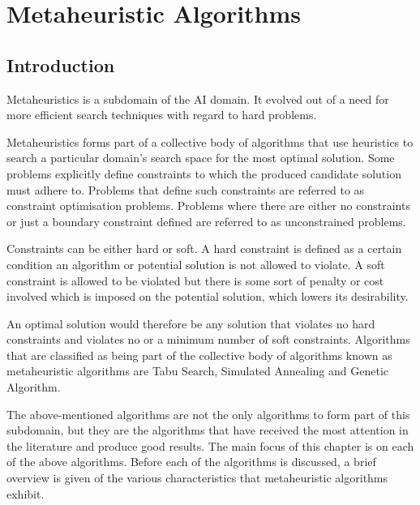 \chapter{Metaheuristic Algorithms}
\label{chpt:heuristic}
\section{Introduction}
Metaheuristics is a subdomain of the \gls{AI} domain\cite{AIModernApproach}. It evolved out of a need for more efficient search techniques with regard to hard problems. 

Metaheuristics forms part of a collective body of algorithms that use heuristics to search a particular domain's search space for the most optimal solution\cite{AIModernApproach,NatureInspiredMetaHeuristic}. Some problems explicitly define constraints to which the produced candidate solution must adhere to. Problems that define such constraints are referred to as constraint optimisation problems\cite{FundamentalSwarm}. Problems where there are either no constraints or just a boundary constraint  defined are referred to as unconstrained problems\cite{FundamentalSwarm}.

Constraints can be either hard or soft. A hard constraint is defined as a certain condition an algorithm or potential solution is not allowed to violate\cite{AIModernApproach,NatureInspiredMetaHeuristic,Karen2004,Eisenblatter}. A soft constraint is allowed to be violated but there is some sort of penalty or cost involved which is imposed on the potential solution, which lowers its desirability\cite{AIModernApproach,NatureInspiredMetaHeuristic,Karen2004,Eisenblatter}. 

An optimal solution would therefore be any solution that violates no hard constraints and violates no or a minimum number of soft constraints\cite{AIModernApproach,NatureInspiredMetaHeuristic,Karen2004,Eisenblatter}. Algorithms that are classified as being part of the collective body of algorithms known as metaheuristic algorithms are Tabu Search\cite{TabuVechicleRoutingWithTimeWindows,TabuCSP}, Simulated Annealing \cite{SASingleMultiObj,CurveFittingSA} and Genetic Algorithm\cite{GATSP, GeostatisticalGA}.

The above-mentioned algorithms are not the only algorithms to form part of this subdomain, but they are the algorithms that have received the most attention in the literature and produce good results\cite{SweepMeta}.
The main focus of this chapter is on each of the above algorithms. Before each of the algorithms is discussed, a brief overview is given of the various characteristics that metaheuristic algorithms exhibit. 

